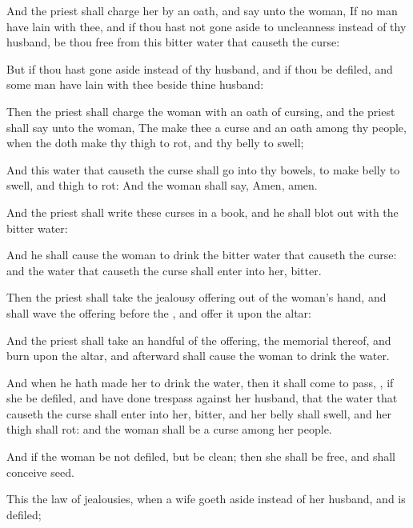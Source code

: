 {And the
priest shall charge her by an
oath, and
say unto the
woman, If no
man have
lain with thee, and if thou hast not gone
aside to
uncleanness
{} instead of thy
husband, be thou
free from this
bitter
water that causeth the
curse:

But if thou hast gone
aside
{} instead of thy
husband, and if thou be
defiled, and some
man
have
lain with thee
beside thine
husband:

Then the
priest shall
charge the
woman with an
oath of
cursing, and the
priest shall
say unto the
woman, The
{}
make thee a
curse and an
oath
among thy
people, when the
{} doth
make thy
thigh to
rot, and thy
belly to
swell;

And this
water that causeth the
curse shall
go into thy
bowels, to make
{}
belly to
swell, and
{}
thigh to
rot: And the
woman shall
say,
Amen,
amen.

And the
priest shall
write these
curses in a
book, and he shall
blot
{} out with the
bitter
water:

And he shall cause the
woman to
drink the
bitter
water that causeth the
curse: and the
water that causeth the
curse shall
enter into her,
{}
bitter.

Then the
priest shall
take the
jealousy
offering out of the
woman’s
hand, and shall
wave the
offering
before the
{}, and
offer it upon the
altar:

And the
priest shall take an
handful of the
offering,
{} the
memorial thereof, and
burn
{} upon the
altar, and
afterward shall cause the
woman to
drink the
water.

And when he hath made her to
drink the
water, then it shall come to pass,
{}, if she be
defiled, and have
done
trespass against her
husband, that the
water that causeth the
curse shall
enter into her,
{}
bitter, and her
belly shall
swell, and her
thigh shall
rot: and the
woman shall be a
curse
among her
people.

And if the
woman be not
defiled, but be
clean; then she shall be
free, and shall
conceive
seed.

This
{} the
law of
jealousies, when a
wife goeth
aside
{} instead of her
husband, and is
defiled;

}
